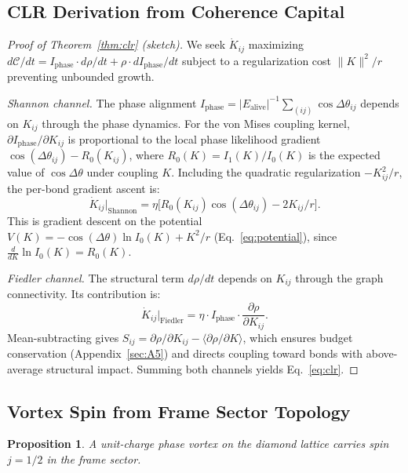 \documentclass[aps,prd,onecolumn,superscriptaddress,floatfix,12pt]{revtex4-2}
\newcommand{\Rzero}{R_0}
\newcommand{\Iphase}{I_{\text{phase}}}
\newcommand{\Ealive}{E_{\text{alive}}}
\newtheorem{proposition}{Proposition}[section]
\begin{document}
\subsection{CLR Derivation from Coherence Capital}\label{sec:A9}

\begin{proof}[Proof of Theorem~\ref{thm:clr} (sketch)]
We seek $\dot{K}_{ij}$ maximizing $d\mathcal{C}/dt = \Iphase \cdot d\rho/dt + \rho \cdot d\Iphase/dt$ subject to a regularization cost $\|K\|^2/r$ preventing unbounded growth.

\emph{Shannon channel.} The phase alignment $\Iphase = |\Ealive|^{-1}\sum_{(ij)} \cos\Delta\theta_{ij}$ depends on $K_{ij}$ through the phase dynamics. For the von Mises coupling kernel, $\partial \Iphase/\partial K_{ij}$ is proportional to the local phase likelihood gradient $\cos(\Delta\theta_{ij}) - \Rzero(K_{ij})$, where $\Rzero(K) = I_1(K)/I_0(K)$ is the expected value of $\cos\Delta\theta$ under coupling $K$. Including the quadratic regularization $-K_{ij}^2/r$, the per-bond gradient ascent is:
\[
\dot{K}_{ij}\big|_{\text{Shannon}} = \eta\bigl[\Rzero(K_{ij})\cos(\Delta\theta_{ij}) - 2K_{ij}/r\bigr].
\]
This is gradient descent on the potential $V(K) = -\cos(\Delta\theta)\ln I_0(K) + K^2/r$ (Eq.~\ref{eq:potential}), since $\frac{d}{dK}\ln I_0(K) = \Rzero(K)$.

\emph{Fiedler channel.} The structural term $d\rho/dt$ depends on $K_{ij}$ through the graph connectivity. Its contribution is:
\[
\dot{K}_{ij}\big|_{\text{Fiedler}} = \eta \cdot \Iphase \cdot \frac{\partial\rho}{\partial K_{ij}}.
\]
Mean-subtracting gives $S_{ij} = \partial\rho/\partial K_{ij} - \langle\partial\rho/\partial K\rangle$, which ensures budget conservation (Appendix~\ref{sec:A5}) and directs coupling toward bonds with above-average structural impact. Summing both channels yields Eq.~\eqref{eq:clr}.
\end{proof}

\subsection{Vortex Spin from Frame Sector Topology}\label{sec:A10}

\begin{proposition}\label{prop:spin-half}
A unit-charge phase vortex on the diamond lattice carries spin $j = 1/2$ in the frame sector.
\end{proposition}
\end{document}
